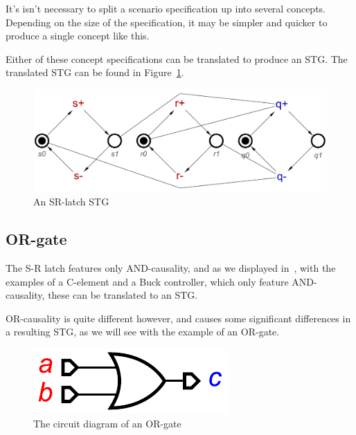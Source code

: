 \documentclass[british, journal]{IEEEtran}
\begin{document}
\noindent It's isn't necessary to split a scenario specification up into several concepts. 
Depending on the size of the specification, it may be simpler and quicker to 
produce a single concept like this.

Either of these concept specifications can be translated to produce an STG. 
The translated STG can be found in Figure~\ref{fig:sr-latch-stg}.

\vspace{-3mm}

\begin{figure}[h]
\begin{centering}
\includegraphics[scale=0.25]{Images/sr-latch-stg}
\par\end{centering}
\vspace{-1mm}
\protect\caption{\label{fig:sr-latch-stg} An SR-latch STG}
\vspace{-5mm}
\end{figure}

\vspace{-5mm}
\subsection{OR-gate \label{sub:or-gate}}

The S-R latch features only AND-causality, and as we displayed 
in~\cite{2015_Beaumont_MEMOCODE}, with the examples of a C-element 
and a Buck controller, which only feature AND-causality, these can be translated
to an STG. 

OR-causality is quite different however, and causes some significant differences 
in a resulting STG, as we will see with the example of an OR-gate. 

\begin{figure}[h]
\begin{centering}
\includegraphics[scale=0.55]{Images/or-gate-circuit}
\par\end{centering}

\protect\caption{\label{fig:or-gate-circuit} The circuit diagram of an OR-gate}
\vspace{-3mm}
\end{figure}
\end{document}
